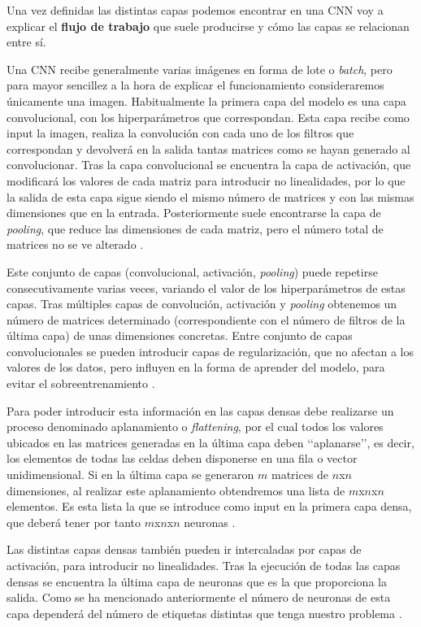 Una vez definidas las distintas capas podemos encontrar en una CNN voy a explicar el \textbf{flujo de trabajo} que suele producirse y cómo las capas se relacionan entre sí.

Una CNN recibe generalmente varias imágenes en forma de lote o \textit{batch}, pero para mayor sencillez a la hora de explicar el funcionamiento consideraremos únicamente una imagen. Habitualmente la primera capa del modelo es una capa convolucional, con los hiperparámetros que correspondan. Esta capa recibe como input la imagen, realiza la convolución con cada uno de los filtros que correspondan y devolverá en la salida tantas matrices como se hayan generado al convolucionar. Tras la capa convolucional se encuentra la capa de activación, que modificará los valores de cada matriz para introducir no linealidades, por lo que la salida de esta capa sigue siendo el mismo número de matrices y con las mismas dimensiones que en la entrada. Posteriormente suele encontrarse la capa de \textit{pooling}, que reduce las dimensiones de cada matriz, pero el número total de matrices no se ve alterado \cite{cnn:biblia_deeplearning, cnn:gu}.

Este conjunto de capas (convolucional, activación, \textit{pooling}) puede repetirse consecutivamente varias veces, variando el valor de los hiperparámetros de estas capas. Tras múltiples capas de convolución, activación y \textit{pooling} obtenemos un número de matrices determinado (correspondiente con el número de filtros de la última capa) de unas dimensiones concretas. Entre conjunto de capas convolucionales se pueden introducir capas de regularización, que no afectan a los valores de los datos, pero influyen en la forma de aprender del modelo, para evitar el sobreentrenamiento \cite{cnn:biblia_machinelearning}.

Para poder introducir esta información en las capas densas debe realizarse un proceso denominado aplanamiento o \textit{flattening}, por el cual todos los valores ubicados en las matrices generadas en la última capa deben \lq\lq aplanarse\rq\rq, es decir, los elementos de todas las celdas deben disponerse en una fila o vector unidimensional. Si en la última capa se generaron $m$ matrices de $n$x$n$ dimensiones, al realizar este aplanamiento obtendremos una lista de $m$x$n$x$n$ elementos. Es esta lista la que se introduce como input en la primera capa densa, que deberá tener por tanto $m$x$n$x$n$ neuronas \cite{cnn:biblia_deeplearning, cnn:osea}.

Las distintas capas densas también pueden ir intercaladas por capas de activación, para introducir no linealidades. Tras la ejecución de todas las capas densas se encuentra la última capa de neuronas que es la que proporciona la salida. Como se ha mencionado anteriormente el número de neuronas de esta capa dependerá del número de etiquetas distintas que tenga nuestro problema \cite{cnn:ieee, cnn:biblia_deeplearning}. 

